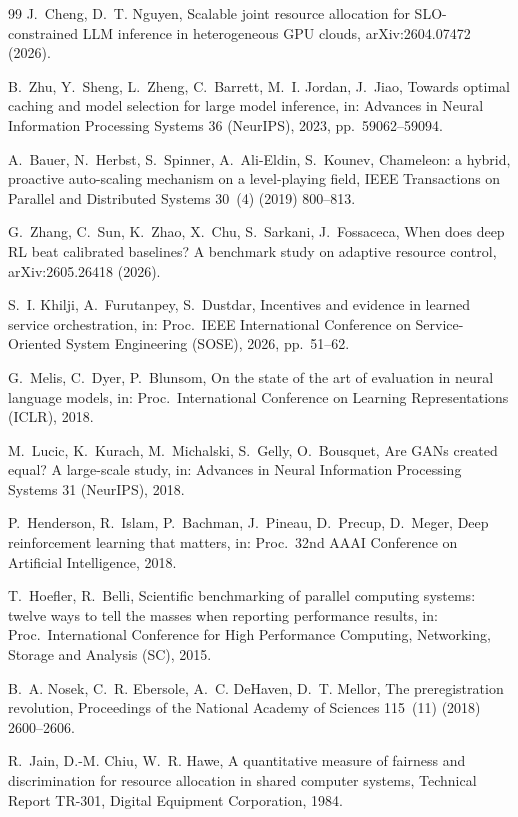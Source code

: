 \documentclass[preprint,12pt]{elsarticle}
\begin{document}
\begin{thebibliography}{99}
J.~Cheng, D.~T. Nguyen, Scalable joint resource allocation for
SLO-constrained LLM inference in heterogeneous GPU clouds,
arXiv:2604.07472 (2026).

B.~Zhu, Y.~Sheng, L.~Zheng, C.~Barrett, M.~I. Jordan, J.~Jiao, Towards
optimal caching and model selection for large model inference, in:
Advances in Neural Information Processing Systems 36 (NeurIPS), 2023,
pp.~59062--59094.

A.~Bauer, N.~Herbst, S.~Spinner, A.~Ali-Eldin, S.~Kounev, Chameleon: a
hybrid, proactive auto-scaling mechanism on a level-playing field, IEEE
Transactions on Parallel and Distributed Systems 30~(4) (2019) 800--813.

G.~Zhang, C.~Sun, K.~Zhao, X.~Chu, S.~Sarkani, J.~Fossaceca, When does deep
RL beat calibrated baselines? A benchmark study on adaptive resource
control, arXiv:2605.26418 (2026).

S.~I. Khilji, A.~Furutanpey, S.~Dustdar, Incentives and evidence in learned
service orchestration, in: Proc.\ IEEE International Conference on
Service-Oriented System Engineering (SOSE), 2026, pp.~51--62.

G.~Melis, C.~Dyer, P.~Blunsom, On the state of the art of evaluation in
neural language models, in: Proc.\ International Conference on Learning
Representations (ICLR), 2018.

M.~Lucic, K.~Kurach, M.~Michalski, S.~Gelly, O.~Bousquet, Are GANs created
equal? A large-scale study, in: Advances in Neural Information Processing
Systems 31 (NeurIPS), 2018.

P.~Henderson, R.~Islam, P.~Bachman, J.~Pineau, D.~Precup, D.~Meger, Deep
reinforcement learning that matters, in: Proc.\ 32nd AAAI Conference on
Artificial Intelligence, 2018.

T.~Hoefler, R.~Belli, Scientific benchmarking of parallel computing
systems: twelve ways to tell the masses when reporting performance
results, in: Proc.\ International Conference for High Performance
Computing, Networking, Storage and Analysis (SC), 2015.

B.~A. Nosek, C.~R. Ebersole, A.~C. DeHaven, D.~T. Mellor, The
preregistration revolution, Proceedings of the National Academy of
Sciences 115~(11) (2018) 2600--2606.

R.~Jain, D.-M. Chiu, W.~R. Hawe, A quantitative measure of fairness and
discrimination for resource allocation in shared computer systems,
Technical Report TR-301, Digital Equipment Corporation, 1984.


\end{thebibliography}
\end{document}
